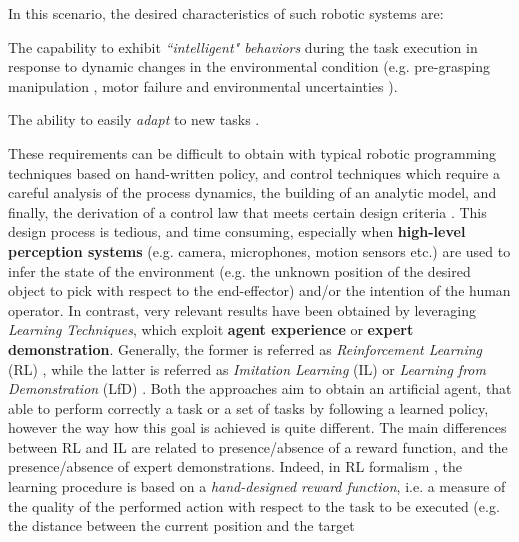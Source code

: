 In this scenario, the desired characteristics of such robotic systems are:\begin{enumerate*}[label=\textbf{(\alph*)}]
    \item The capability to exhibit \textit{``intelligent" behaviors} during the task execution in response to dynamic
    changes in the environmental condition (e.g. pre-grasping manipulation \cite{kalashnikov2018qt_opt}, motor failure
    and environmental uncertainties \cite{anne2021meta_learning_fast_adaptive}).
    \item The ability to easily \textit{adapt} to new tasks \cite{jang2022bc_z}. 
\end{enumerate*}
\newline These requirements can be difficult to obtain with typical robotic programming techniques based on hand-written
policy, and control techniques which require a careful analysis of the process dynamics, the building of an analytic
model, and finally, the derivation of a control law that meets certain design criteria
\cite{hafner2011reinforcement_in_feedback_controll}. This design process is tedious, and time consuming, especially when
\textbf{high-level perception systems} (e.g. camera, microphones, motion sensors etc.) are used to infer the state of
the environment (e.g. the unknown position of the desired object to pick with respect to the end-effector) and/or the
intention of the human operator. \newline In contrast, very relevant results have been obtained by leveraging
\textit{Learning Techniques}, which exploit \textbf{agent experience} or \textbf{expert demonstration}. Generally, the
former is referred as \textit{Reinforcement Learning} (RL) \cite{sutton2018reinforcement}, while the latter is referred
as \textit{Imitation Learning} (IL) or \textit{Learning from Demonstration} (LfD)
\cite{argall2009robot_learning_from_demonstration}. Both the approaches aim to obtain an artificial agent, that able to
perform correctly a task or a set of tasks by following a learned policy, however the way how this goal is achieved is
quite different. The main differences between RL and IL are related to presence/absence of a reward function, and the
presence/absence of expert demonstrations. \newline Indeed, in RL formalism \cite{kaelbling1996reinforcement_survey},
the learning procedure is based on a \textit{hand-designed reward function}, i.e. a measure of the quality of the
performed action with respect to the task to be executed (e.g. the distance between the current position and the target
